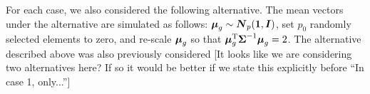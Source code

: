 \documentclass[times,sort&compress,3p]{elsarticle}
\theoremstyle{plain}%
\theoremstyle{definition}
\def\trace{\hbox{trace}}
\def\trace{\hbox{trace}}
\def\trans{^{\rm T}}
\newcommand{\uI}       {\mbox{\boldmath$I$}}
\newcommand{\uN}       {\mbox{\boldmath$N$}}
\newcommand{\umu}               {\mbox{\boldmath$\mu$}}
\newcommand{\uSigma}            {\mbox{\boldmath$\Sigma$}}
\begin{document}
For each case, we also considered the following alternative. The mean vectors under the alternative are simulated as follows:
 $\umu_g \sim \uN_{p}(\bf{1}, \uI)$, set $p_0$ randomly selected elements to zero, and re-scale $\umu_g$ so that $\umu_g \trans\uSigma ^{-1}  \umu_g = 2$.
The alternative described above was also previously considered \cite{srivastava2014raptt,zoh2018powerful} {\color{blue}[It looks like we are considering two alternatives here? If so it would be better if we state this explicitly before ``In case 1, only...'']}
\end{document}
